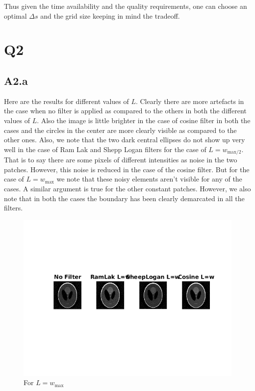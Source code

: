 \documentclass{article}
\begin{document}
Thus given the time availability and the quality requirements, one can choose an optimal $ \Delta s $  and the grid size keeping in mind the tradeoff.  


\section*{Q2}
\subsection*{A2.a}

Here are the results for different values of $L$. Clearly there are more artefacts in the case when no filter is applied as compared to the others in both the different values of $L$.  Also the image is little brighter in the case of cosine filter in both the cases and the circles in the center are more clearly visible as compared to the other ones. Also, we note that the two dark central ellipses do not show up very well in the case of Ram Lak and Shepp Logan filters for the case of $L = w_{\text{max}/2}$. That is to say there are some pixels of different intensities as noise in the two patches. However, this noise is reduced in the case of the cosine filter. But for the case of $L = w_{\text{max}}$ we note that these noisy elements aren't visible for any of the cases. A similar argument is true for the other constant patches. However, we also note that in both the cases the boundary has been clearly demarcated in all the filters.
 
\begin{figure}[h]
	\centering
	\includegraphics[scale = 0.9]{code/html/mainScript_02.png}
	\caption{For $L = w_{\text{max}}$}
	\label{Fig :2a1}
\end{figure}
\end{document}
